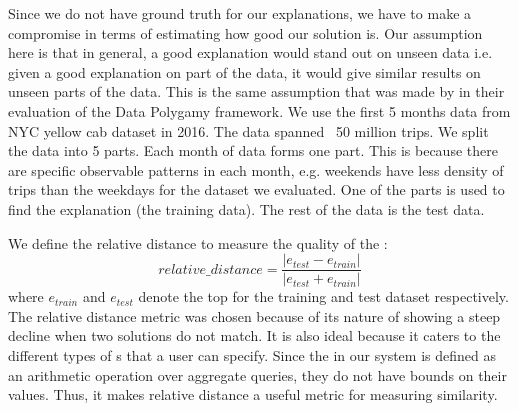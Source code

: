 Since we do not have ground truth for our explanations, we have to make a compromise in terms of estimating how good our solution is. Our assumption here is that in general, a good explanation would stand out on unseen data i.e. given a good explanation on part of the data, it would give similar results on unseen parts of the data. This is the same assumption that was made by \cite{chirigati2016data} in their evaluation of the Data Polygamy framework. 
We use the first 5 months data from  NYC yellow cab dataset in 2016. The data spanned ~50 million trips. 
We split the data into 5 parts. Each month of data forms one part. 
This is because there are specific observable patterns in each month, e.g. weekends have less density of trips than the weekdays for the dataset we evaluated. 
One of the parts is used to find the explanation (the training data). The rest of the data is the test data. 


We define the relative distance to measure the quality of the {\explanation}:
$$relative\_distance = \frac{|e_{test}-e_{train}|}{|e_{test}+e_{train}|}$$
where $e_{train}$ and $e_{test}$ denote the top {\explanation} for the training and test dataset respectively. 
The relative distance metric was chosen because of its nature of showing a steep decline when two solutions do not match. It is also ideal because it caters to the different types of {\fact}s that a user can specify. Since the {\fact} in our system is defined as an arithmetic operation over aggregate queries, they do not have bounds on their values. Thus, it makes relative distance a useful metric for measuring similarity.

